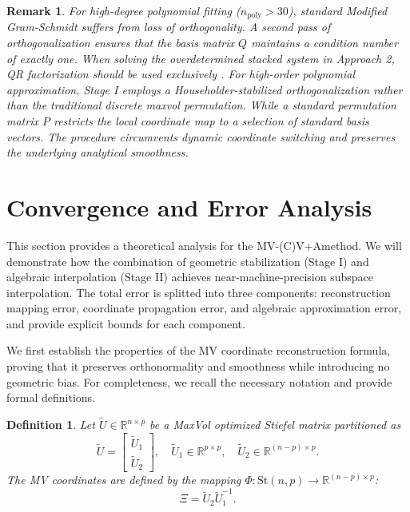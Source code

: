 \documentclass[11pt]{article}
\newtheorem{remark}{Remark}
\newtheorem{definition}{Definition}
\begin{document}
\begin{remark}
For high-degree polynomial fitting ($n_{\text{poly}} > 30$), standard Modified Gram-Schmidt suffers from loss of orthogonality. A second pass of orthogonalization ensures that the basis matrix $Q$ maintains a condition number of exactly one. When solving the overdetermined stacked system in Approach 2, QR factorization should be used exclusively \cite{higham2002accuracy,trefethen2020}.
For high-order polynomial approximation, Stage I employs a Householder-stabilized orthogonalization \cite{Gander2014ScientificComputing,dax2004householder} rather than the traditional discrete maxvol permutation. While a standard permutation matrix $P$ restricts the local coordinate map to a selection of standard basis vectors. The procedure circumvents dynamic coordinate switching and preserves the underlying analytical smoothness.
\end{remark}

\section{Convergence and Error Analysis}
\label{sec5}
This section provides a theoretical analysis for the MV-(C)V+Amethod. We will demonstrate how the combination of geometric stabilization (Stage I) and algebraic interpolation (Stage II) achieves near-machine-precision subspace interpolation. The total error is splitted into three components: reconstruction mapping error, coordinate propagation error, and algebraic approximation error, and provide explicit bounds for each component.
 
We first establish the properties of the MV coordinate reconstruction formula, proving that it preserves orthonormality and smoothness while introducing no geometric bias. For completeness, we recall the necessary notation and provide formal definitions.

\begin{definition}
Let $\widetilde U \in \mathbb{R}^{n \times p}$ be a MaxVol optimized Stiefel matrix partitioned as
$$
\widetilde U = \begin{bmatrix} \widetilde U_1 \\ \widetilde U_2 \end{bmatrix}, \quad \widetilde U_1 \in \mathbb{R}^{p \times p}, \quad \widetilde U_2 \in \mathbb{R}^{(n-p) \times p}.
$$
The MV coordinates are defined by the mapping $\Phi: \text{St}(n,p) \to \mathbb{R}^{(n-p) \times p}$:
$$
\Xi = \widetilde U_2 \widetilde U_1^{-1}.
$$
\end{definition}
\end{document}
